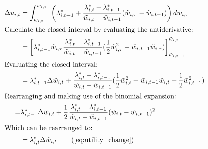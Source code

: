 \documentclass[../main.tex]{subfiles}
\begin{document}
\begin{align}
	\Delta u_{i,t} &= \int^{w_{i,t}}_{w_{i,t-1}} \left(  \lambda_{i,t-1}^* + \frac{\lambda_{i,t}^* - \lambda_{i,t-1}^*}{\tilde{w}_{i,t} - \tilde{w}_{i,t-1}} (\tilde{w}_{i,\tau} - \tilde{w}_{i,t-1})\right) dw_{i,\tau} \nonumber \\
	\intertext{Calculate the closed interval by evaluating the antiderivative:}
	{} &= \left[ \lambda_{i,t-1}^* \tilde{w}_{i,\tau} \frac{\lambda_{i,t}^* - \lambda_{i,t-1}^*}{\tilde{w}_{i,t} - \tilde{w}_{i,t-1}}(\frac{1}{2} \tilde{w}_{i, \tau}^2 - \tilde{w}_{i,t-1} \tilde{w}_{i,\tau}) \right ]^{\tilde{w}_{i,t}}_{\tilde{w}_{i,t-1}} \nonumber \\
	\intertext{Evaluating the closed interval:}
	{} &= \lambda_{i,t-1}^* \Delta \tilde{w}_{i,t} + \frac{\lambda_{i,t}^* - \lambda_{i,t-1}^*}{\tilde{w}_{i,t}-\tilde{w}_{i,t-1}} ( \frac{1}{2} \tilde{w}_{i,t}^2 - \tilde{w}_{i,t-1} \tilde{w}_{i,t} + \frac{1}{2} \tilde{w}_{i,t-1}^2 ) \nonumber \\
	\intertext{Rearranging and making use of the binomial expansion:}
	{} =& \lambda_{i,t-1}^* \Delta \tilde{w}_{i,t} + \frac{1}{2} \frac{\lambda_{i,t}^* - \lambda_{i,t-1}^*}{\tilde{w}_{i,t}-\tilde{w}_{i,t-1}} (\tilde{w}_{i,t} - \tilde{w}_{i,t-1})^2 \nonumber \\
	\intertext{Which can be rearranged to:}
	{} &= \bar{\lambda}_{i,t}^* \Delta \tilde{w}_{i,t} \tag{\ref{eq:utility_change}}
\end{align}
\end{document}
